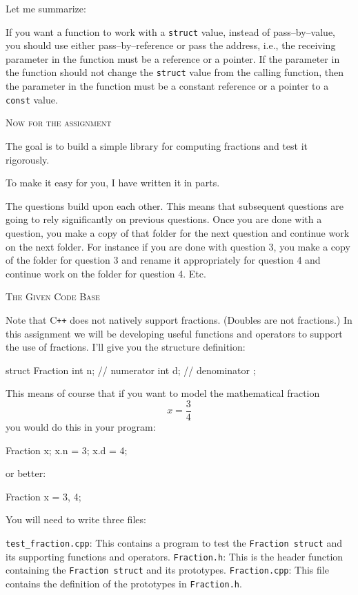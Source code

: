 Let me summarize:
\begin{itemize}
  \li If you want a function to work with a \verb!struct! value, instead of
pass--by--value, you should use either pass--by--reference or pass the address,
i.e., the receiving parameter in the function must be a reference or a pointer.
  \li If the parameter in the function should not change the \verb!struct!
value from the calling function, then the parameter in the function must be a
constant reference or a pointer to a \verb!const! value.
\end{itemize}




\newpage
\textsc{Now for the assignment}

The goal is to build a simple library for computing fractions and test it
rigorously.

To make it easy for you, I have written it in parts.

The questions build upon each other. This means that subsequent questions are
going to rely significantly on previous questions.
Once you are done with a question, you make a copy of that folder
for the next question and continue work on the next folder.
For instance if you are done with question 3, you make a copy of the
folder for question 3 and rename it appropriately for question 4 and
continue work on the folder for question 4. Etc.



\newpage
\textsc{The Given Code Base}

Note that C\texttt{++}
does not natively support fractions. (Doubles are not fractions.)
In this assignment we will be developing useful functions and operators to
support the use of fractions. I'll give you the structure definition:
\begin{console}
struct Fraction
{
    int n; // numerator
    int d; // denominator
};
\end{console}

This means of course that if you want to model the mathematical fraction
\[x = \frac{3}{4}\]
you would do this in your program:
\begin{console}
Fraction x;
x.n = 3;
x.d = 4;
\end{console}
or better:
\begin{console}
Fraction x = {3, 4};
\end{console}

You will need to write three files:
\begin{itemize}
  \li \verb!test_fraction.cpp!: This contains a program to test the
      \verb!Fraction struct! and its supporting functions and operators.
  \li \verb!Fraction.h!: This is the header function containing the
      \verb!Fraction struct! and its prototypes.
  \li \verb!Fraction.cpp!: This file contains the definition of the prototypes
      in \verb!Fraction.h!.
\end{itemize}

